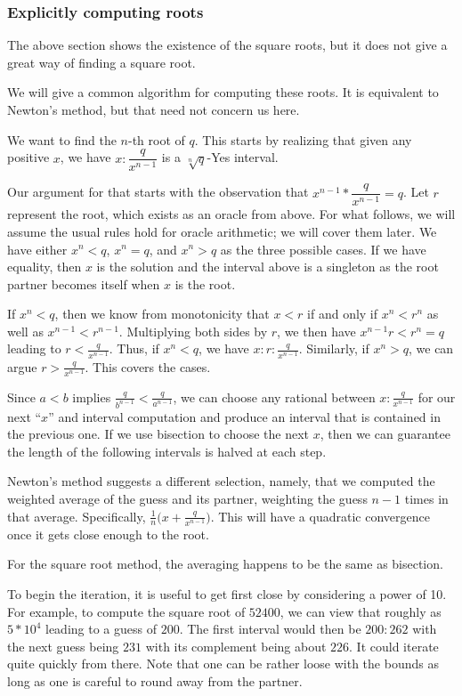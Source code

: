 \documentclass[12pt]{article}
\theoremstyle{remark}
\begin{document}
\subsubsection{Explicitly computing roots}

The above section shows the existence of the square roots, but it does not give a great way of finding a square root. 

We will give a common algorithm for computing these roots. It is equivalent to Newton's method, but that need not concern us here. 

We want to find the $n$-th root of $q$. This starts by realizing that given any positive $x$, we have $x:\dfrac{q}{x^{n-1}}$ is a $\sqrt[n]{q}$-Yes interval. 

Our argument for that starts with the observation that $x^{n-1}*\dfrac{q}{x^{n-1}} = q$. Let $r$ represent the root, which exists as an oracle from above. For what follows, we will assume the usual rules hold for oracle arithmetic; we will cover them later. We have either $x^n < q$, $x^n = q$, and $x^n > q$ as the three possible cases. If we have equality, then $x$ is the solution and the interval above is a singleton as the root partner becomes itself when $x$ is the root. 

If $x^n < q$, then we know from monotonicity that $x < r$ if and only if $x^n < r^n$ as well as $x^{n-1} < r^{n-1}$. Multiplying both sides by $r$, we then have $x^{n-1} r < r^{n} = q$ leading to $r < \frac{q}{x^{n-1}}$. Thus, if $x^n < q$, we have $x:r:\frac{q}{x^{n-1}}$. Similarly, if $x^n > q$, we can argue $r > \frac{q}{x^{n-1}}$. This covers the cases. 

Since $a<b$ implies $\frac{q}{b^{n-1}} < \frac{q}{a^{n-1}}$, we can choose any rational between $x:\frac{q}{x^{n-1}}$ for our next ``$x$'' and interval computation and produce an interval that is contained in the previous one. If we use bisection to choose the next $x$, then we can guarantee the length of the following intervals is halved at each step. 

Newton's method suggests a different selection, namely, that we computed the weighted average of the guess and its partner, weighting the guess $n-1$ times in that average. Specifically, $\frac{1}{n} \big( x + \frac{q}{x^{n-1}} \big)$. This will have a quadratic convergence once it gets close enough to the root. 

For the square root method, the averaging happens to be the same as bisection. 

To begin the iteration, it is useful to get first close by considering a power of 10. For example, to compute the square root of $52400$, we can view that roughly as $5*10^4$ leading to a guess of $200$. The first interval would then be $200:262$ with the next guess being $231$ with its complement being about $226$. It could iterate quite quickly from there. Note that one can be rather loose with the bounds as long as one is careful to round away from the partner.  
\end{document}
